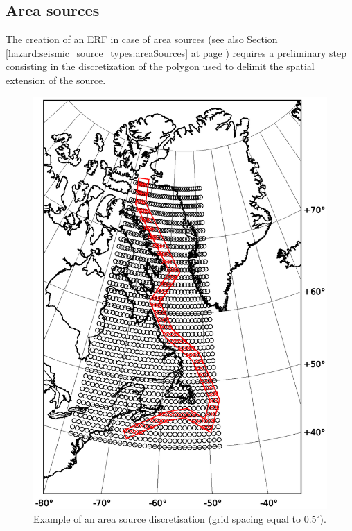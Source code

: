 \subsection{Area sources}
%
The creation of an ERF in case of area sources (see also Section \ref{hazard:seismic_source_types:areaSources} at page \pageref{hazard:seismic_source_types:areaSources}) requires a preliminary step 
consisting in the discretization of the polygon used to delimit the spatial extension of the source. 

%
\begin{figure}[!ht]
\centering
\includegraphics[width=18cm]{./Figures/Part_Hazard/area_source_discretization.eps}
\caption{Example of an area source discretisation (grid spacing equal to 0.5$^\circ$).}
\label{fig:area_source_discret}
\end{figure}
%

